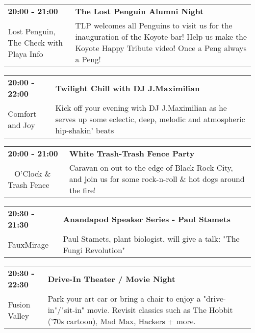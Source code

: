 \begin{tabular}{ p{1in} p{2.2in} }
    \textbf{20:00 - 21:00} & \textbf{The Lost Penguin Alumni Night} \\
    Lost Penguin, The \newline Check with Playa Info & TLP welcomes all Penguins to visit us for the inauguration of the Koyote bar! Help us make the Koyote Happy Tribute video!  Once a Peng always a Peng! \\
    \hline 
\end{tabular}
    
\begin{tabular}{ p{1in} p{2.2in} }
    \textbf{20:00 - 22:00} & \textbf{Twilight Chill with DJ J.Maximilian} \\
    Comfort and Joy \newline  & Kick off your evening with DJ J.Maximilian  as he serves up some eclectic, deep, melodic and atmospheric hip-shakin' beats \\
    \hline 
\end{tabular}
    
\begin{tabular}{ p{1in} p{2.2in} }
    \textbf{20:00 - 21:00} & \textbf{White Trash-Trash Fence Party} \\
    ~ \newline 12 O'Clock \& Trash Fence & Caravan on out to the edge of Black Rock City, and join us for some rock-n-roll \& hot dogs around the fire! \\
    \hline 
\end{tabular}
    
\begin{tabular}{ p{1in} p{2.2in} }
    \textbf{20:30 - 21:30} & \textbf{Anandapod Speaker Series - Paul Stamets} \\
    FauxMirage \newline  & Paul Stamets, plant biologist, will give a talk: "The Fungi Revolution" \\
    \hline 
\end{tabular}
    
\begin{tabular}{ p{1in} p{2.2in} }
    \textbf{20:30 - 22:30} & \textbf{Drive-In Theater / Movie Night} \\
    Fusion Valley \newline  & Park your art car or bring a chair to enjoy a "drive-in"/"sit-in" movie. Revisit classics such as The Hobbit ('70s cartoon), Mad Max, Hackers + more. \\
    \hline 
\end{tabular}
    
